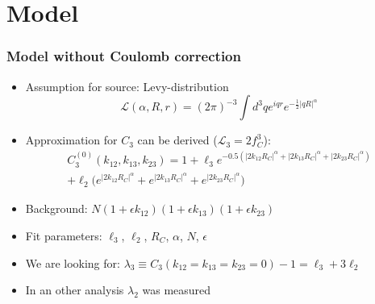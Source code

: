 \documentclass{beamer}
\begin{document}
\section{Model}
\begin{frame}
\frametitle{Model without Coulomb correction}
\begin{itemize}
\setlength{\itemsep}{12pt}
\item Assumption for source: Levy-distribution
\begin{equation*}
\mathcal{L}(\alpha,R,r)=(2\pi)^{-3} \int d^3q e^{iqr} e^{-\frac{1}{2}|qR|^{\alpha}}
\end{equation*}
\item Approximation for $C_3$ can be derived ($\mathcal{L}_3=2f_C^3$):
\begin{align*}
C_3^{(0)}(k_{12}, k_{13}, k_{23}) = 1+ \ell_3e^{-0.5(|2k_{12}R_C|^\alpha+|2k_{13}R_C|^\alpha+|2k_{23}R_C|^\alpha)}\nonumber\\
+\ell_2\bigg(e^{|2k_{12}R_C|^\alpha}+e^{|2k_{13}R_C|^\alpha}+e^{|2k_{23}R_C|^\alpha}\bigg)
\end{align*}
\item Background: $N(1+\epsilon k_{12})(1+\epsilon k_{13})(1+\epsilon k_{23})$
\item Fit parameters: $\ell_3$, $\ell_2$,  $R_C$, $\alpha$, $N$, $\epsilon$
\item We are looking for: $\lambda_3 \equiv  C_3(k_{12}=k_{13}=k_{23}=0)-1=\ell_3+3\ell_2$
\item In an other analysis $\lambda_2$ was measured
\end{itemize}
\end{frame}
\end{document}
